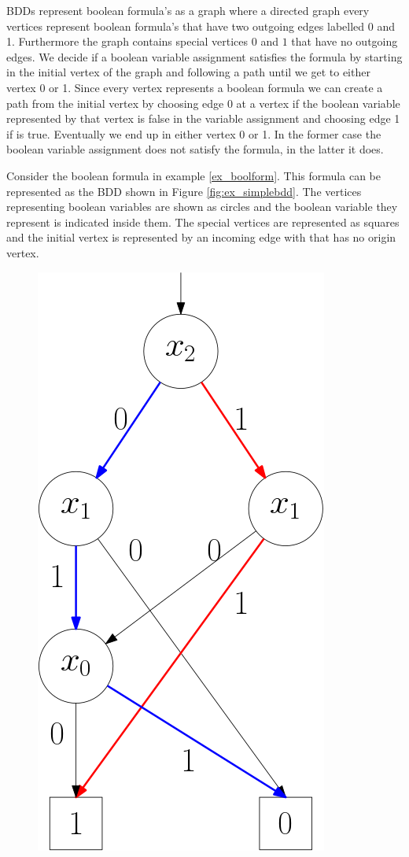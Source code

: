 BDDs represent boolean formula's as a graph where a directed graph every vertices represent boolean formula's that have two outgoing edges labelled 0 and 1. Furthermore the graph contains special vertices $0$ and $1$ that have no outgoing edges. We decide if a boolean variable assignment satisfies the formula by starting in the initial vertex of the graph and following a path until we get to either vertex 0 or 1. Since every vertex represents a boolean formula we can create a path from the initial vertex by choosing edge 0 at a vertex if the boolean variable represented by that vertex is false in the variable assignment and choosing edge 1 if is true. Eventually we end up in either vertex 0 or 1. In the former case the boolean variable assignment does not satisfy the formula, in the latter it does.

\begin{example}
	Consider the boolean formula in example \ref{ex_boolform}. This formula can be represented as the BDD shown in Figure \ref{fig:ex_simplebdd}. The vertices representing boolean variables are shown as circles and the boolean variable they represent is indicated inside them. The special vertices are represented as squares and the initial vertex is represented by an incoming edge with that has no origin vertex.
\begin{figure}[h]
	\centering
	\includegraphics[scale=0.3]{Examples/BDD/simpleexample}

\end{figure}
\end{example}
